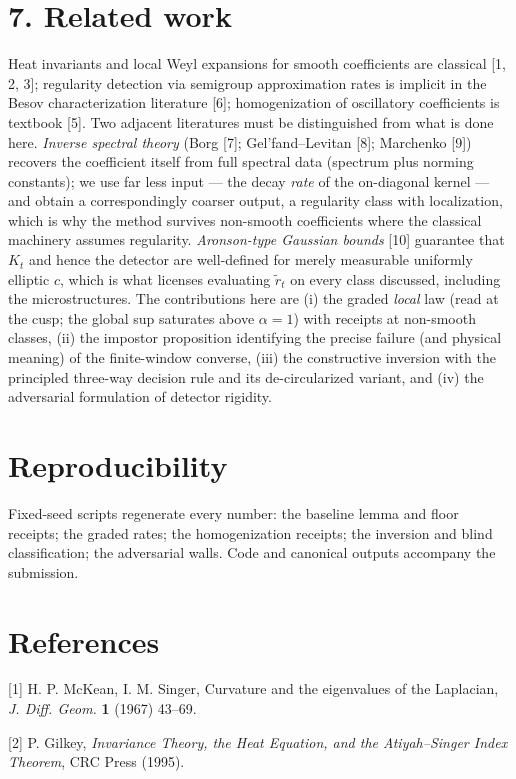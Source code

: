 \documentclass[11pt]{article}
\begin{document}
\section*{7. Related work}
Heat invariants and local Weyl expansions for smooth coefficients are classical [1, 2, 3]; regularity detection via semigroup approximation rates is implicit in the Besov characterization literature [6]; homogenization of oscillatory coefficients is textbook [5].  Two adjacent literatures must be distinguished from what is done here. \emph{Inverse spectral theory} (Borg [7]; Gel'fand–Levitan [8]; Marchenko [9]) recovers the coefficient itself from full spectral data (spectrum plus norming constants); we use far less input — the decay \emph{rate} of the on-diagonal kernel — and obtain a correspondingly coarser output, a regularity class with localization, which is why the method survives non-smooth coefficients where the classical machinery assumes regularity.  \emph{Aronson-type Gaussian bounds} [10] guarantee that $K_t$ and hence the detector are well-defined for merely measurable uniformly elliptic $c$, which is what licenses evaluating $\tilde r_t$ on every class discussed, including the microstructures.  The contributions here are (i) the graded \emph{local} law (read at the cusp; the global sup saturates above $\alpha = 1$) with receipts at non-smooth classes, (ii) the impostor proposition identifying the precise failure (and physical meaning) of the finite-window converse, (iii) the constructive inversion with the principled three-way decision rule and its de-circularized variant, and (iv) the adversarial formulation of detector rigidity.

\section*{Reproducibility}
Fixed-seed scripts regenerate every number: the baseline lemma and floor receipts; the graded rates; the homogenization receipts; the inversion and blind classification; the adversarial walls.  Code and canonical outputs accompany the submission.

\section*{References}
[1] H. P. McKean, I. M. Singer, Curvature and the eigenvalues of the Laplacian, \emph{J. Diff. Geom.} \textbf{1} (1967) 43–69.

[2] P. Gilkey, \emph{Invariance Theory, the Heat Equation, and the Atiyah–Singer Index Theorem}, CRC Press (1995).
\end{document}
